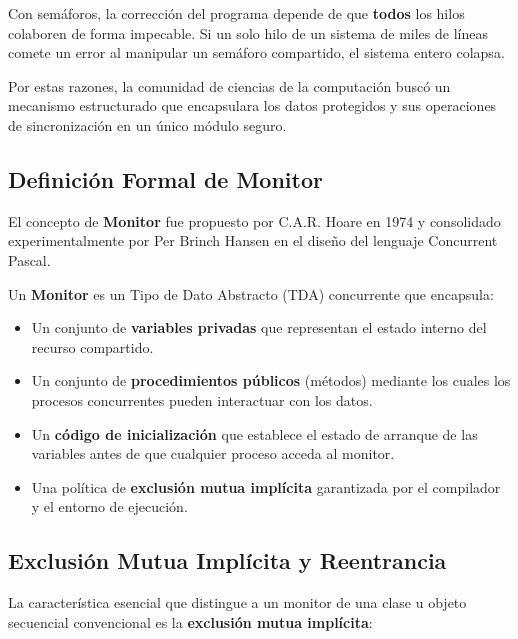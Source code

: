 \begin{aviso}
Con semáforos, la corrección del programa depende de que \textbf{todos} los hilos colaboren de forma impecable. Si un solo hilo de un sistema de miles de líneas comete un error al manipular un semáforo compartido, el sistema entero colapsa.
\end{aviso}

Por estas razones, la comunidad de ciencias de la computación buscó un mecanismo estructurado que encapsulara los datos protegidos y sus operaciones de sincronización en un único módulo seguro.

\subsection{Definición Formal de Monitor}
El concepto de \textbf{Monitor} fue propuesto por C.A.R. Hoare en 1974 y consolidado experimentalmente por Per Brinch Hansen en el diseño del lenguaje Concurrent Pascal.

\begin{definicion}[Monitor]
Un \textbf{Monitor} es un Tipo de Dato Abstracto (TDA) concurrente que encapsula:
\begin{itemize}[leftmargin=*]
    \item Un conjunto de \textbf{variables privadas} que representan el estado interno del recurso compartido.
    \item Un conjunto de \textbf{procedimientos públicos} (métodos) mediante los cuales los procesos concurrentes pueden interactuar con los datos.
    \item Un \textbf{código de inicialización} que establece el estado de arranque de las variables antes de que cualquier proceso acceda al monitor.
    \item Una política de \textbf{exclusión mutua implícita} garantizada por el compilador y el entorno de ejecución.
\end{itemize}
\end{definicion}

\subsection{Exclusión Mutua Implícita y Reentrancia}
La característica esencial que distingue a un monitor de una clase u objeto secuencial convencional es la \textbf{exclusión mutua implícita}:

